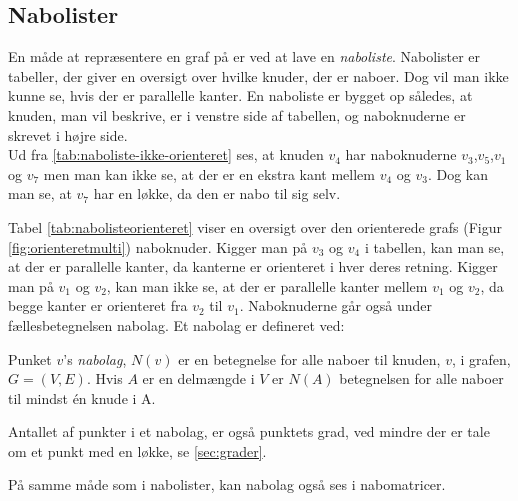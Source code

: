 \subsection{Nabolister}
En måde at repræsentere en graf på er ved at lave en \emph{naboliste}. Nabolister er tabeller, der giver en oversigt over hvilke knuder, der er naboer. Dog vil man ikke kunne se, hvis der er parallelle kanter. En naboliste er bygget op således, at knuden, man vil beskrive, er i venstre side af tabellen, og naboknuderne er skrevet i højre side. \\




Ud fra \autoref{tab:naboliste-ikke-orienteret} ses, at knuden $v_4$ har naboknuderne $v_3$,$v_5$,$v_1$ og $v_7$ men man kan ikke se, at der er en ekstra kant mellem $v_4$ og $v_3$. Dog kan man se, at $v_7$ har en løkke, da den er nabo til sig selv.


Tabel \ref{tab:nabolisteorienteret} viser en oversigt over den orienterede grafs (Figur \ref{fig:orienteretmulti}) naboknuder. Kigger man på $v_3$ og $v_4$ i tabellen, kan man se, at der er parallelle kanter, da kanterne er orienteret i hver deres retning. Kigger man på $v_1$ og $v_2$, kan man ikke se, at der er parallelle kanter mellem $v_1$ og $v_2$, da begge kanter er orienteret fra $v_2$ til $v_1$. Naboknuderne går også under fællesbetegnelsen nabolag. Et nabolag er defineret ved:

\begin{defn}[Nabolag] \label{defn:nabolag}
Punket $v$'s \emph{nabolag}, $N(v)$ er en betegnelse for alle naboer til knuden, $v$, i grafen, $G=(V,E)$. Hvis $A$ er en delmængde i $V$ er $N(A)$ betegnelsen for alle naboer til mindst én knude i A.
\end{defn}

Antallet af punkter i et nabolag, er også punktets grad, ved mindre der er tale om et punkt med en løkke, se \autoref{sec:grader}. 

På samme måde som i nabolister, kan nabolag også ses i nabomatricer.